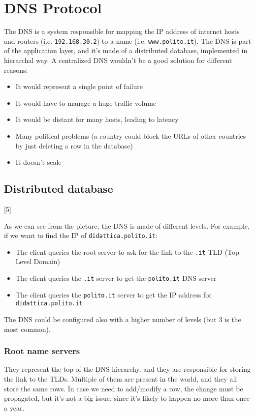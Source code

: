 \section{DNS Protocol}

The DNS is a system responsible for mapping the IP address of internet hosts and routers (i.e. \texttt{192.168.30.2}) to a name (i.e. \texttt{www.polito.it}). The DNS is part of the application layer, and it's made of a distributed database, implemented in hierarchal way. A centralized DNS wouldn't be a good solution for different reasons:
\begin{itemize}
    \item It would represent a single point of failure
    \item It would have to manage a huge traffic volume
    \item It would be distant for many hosts, leading to latency
    \item Many political problems (a country could block the URLs of other countries by just deleting a row in the database)
    \item It doesn't scale
\end{itemize}

\subsection{Distributed database}
[5]

As we can see from the picture, the DNS is made of different levels. For example, if we want to find the IP of \texttt{didattica.polito.it}:
\begin{itemize}
    \item The client queries the root server to ask for the link to the \texttt{.it} TLD (Top Level Domain)
    \item The client queries the \texttt{.it} server to get the \texttt{polito.it} DNS server
    \item The client queries the \texttt{polito.it} server to get the IP address for \texttt{didattica.polito.it}
\end{itemize}

The DNS could be configured also with a higher number of levels (but 3 is the most common).

\subsubsection{Root name servers}
They represent the top of the DNS hierarchy, and they are responsible for storing the link to the TLDs. Multiple of them are present in the world, and they all store the same rows. In case we need to add/modify a row, the change must be propagated, but it's not a big issue, since it's likely to happen no more than once a year.


